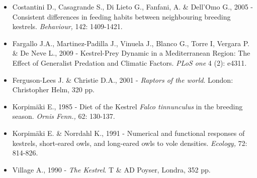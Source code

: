 \begin{itemize}\itemsep0pt
	\item Costantini D., Casagrande S., Di Lieto G., Fanfani, A. \&
Dell{\textquoteright}Omo G., 2005 - Consistent differences in feeding
habits between neighbouring breeding kestrels. \textit{Behaviour,} 142:
1409-1421.

	\item Fargallo J.A., Martinez-Padilla J., Vinuela J., Blanco G., Torre I,
Vergara P. \& De Neve L., 2009 -  Kestrel-Prey Dynamic in a
Mediterranean Region: The Effect of Generalist Predation and Climatic
Factors. \textit{PLoS one} 4 (2): e4311. 

	\item Ferguson-Lees J. \& Christie D.A., 2001 - \textit{Raptors of the world}.
London: Christopher Helm, 320 pp.

	\item Korpim\"aki E., 1985 - Diet of the Kestrel \textit{Falco tinnunculus} in
the breeding season. \textit{Ornis Fenn.,} 62: 130-137.

	\item Korpim\"aki E. \& Norrdahl K., 1991 - Numerical and functional responses
of kestrels, short-eared owls, and long-eared owls to vole densities.
\textit{Ecology,} 72: 814-826.

	\item Village A., 1990 - \textit{The Kestrel}. T \& AD Poyser, Londra, 352 pp.
\end{itemize}

